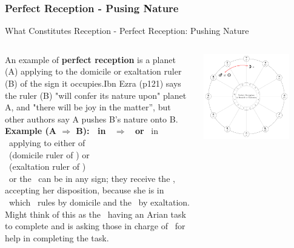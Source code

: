 \subsubsection{Perfect Reception - Pusing Nature}
\begin{frame}[t]{What Constitutes Reception - Perfect Reception: Pushing Nature}
\small
\vspace{0.1cm}
\begin{columns}[T, onlytextwidth]
An example of \textbf{perfect reception} is a planet (A) applying to the domicile or exaltation ruler (B) of the sign it occupies.\footnotemark[1] Ibn Ezra (p121) says the ruler (B) "will confer its nature upon" planet A, and "there will be joy in the matter'', but other authors say A pushes B's nature onto B.  \\
\vspace{0.2cm}
\textbf{Example (A $\Rightarrow$ B): \Moon\ in \Aries\ $\Rightarrow$ \Mars\ or \Sun} 
\ul
\vspace{0.2cm}
\Moon\ in \Aries\ applying to either of \\
\Mars\ (domicile ruler of \Aries) or \\
\Sun\ (exaltation ruler of \Aries) \\
\vspace{0.2cm}
\Mars\ or the \Sun\ can be in any sign; they receive the \Moon, accepting her disposition, because she is in \Aries\ which \Mars\ rules by domicile and the \Sun\ by exaltation. Might think of this as the \Moon\ having an Arian task to complete and is asking those in charge of \Aries\ for help in completing the task.\\


\begin{center}
{\includegraphics[width=0.8\textwidth]{charts/01-perfect-reception}} \\
\end{center}

\end{columns}
\vspace{0.2cm}
\end{frame}
